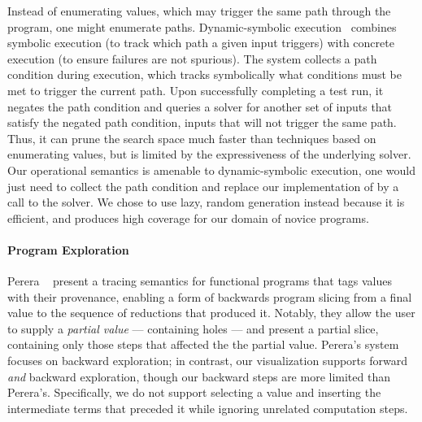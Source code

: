 Instead of enumerating values, which may trigger the same path through
the program, one might enumerate paths. 
%
Dynamic-symbolic execution~\cite{Godefroid2005-am,Cadar2008-kg,Tillmann2008-qc}
%
combines symbolic execution (to track which path a given input
triggers) with concrete execution (to ensure failures are
not spurious). The system collects a path condition during execution,
which tracks symbolically what conditions must be met to trigger the
current path. Upon successfully completing a test run, it negates the
path condition and queries a solver for another set of inputs that
satisfy the negated path condition, \ie inputs that will not trigger the
same path. Thus, it can prune the search space
much faster than techniques based on enumerating values, but is limited
by the expressiveness of the underlying solver. Our operational
semantics is amenable to dynamic-symbolic execution, one would just need
to collect the path condition and replace our implementation of \gensym
by a call to the solver. We chose to use lazy, random generation instead
because it is efficient, and %
produces high coverage for our domain of novice programs.


\paragraph{Program Exploration}
Perera \etal~\cite{Perera2012-dy} present a tracing semantics
for functional programs that tags values with their provenance, enabling
a form of backwards program slicing from a final value to the sequence
of reductions that produced it. Notably, they allow the user to supply a
\emph{partial value} --- containing holes --- and present a partial slice,
containing only those steps that affected the the partial value.
Perera's system focuses on backward exploration; in
contrast, our visualization supports forward \emph{and} backward
exploration, though our backward steps are more limited than
Perera's. Specifically, we do not support selecting a value and
inserting the intermediate terms that preceded it while ignoring
unrelated computation steps. %


